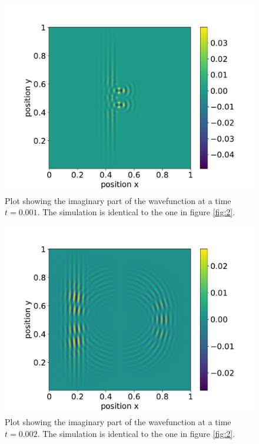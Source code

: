 \documentclass[english,notitlepage,reprint,nofootinbib]{revtex4-1}  %
\begin{document}
\begin{figure}[h!]
    \centering %
    \includegraphics[scale=0.35]{figures/contur_imag_2_12T.pdf} %
    \caption{Plot showing the imaginary part of the wavefunction at a time $t=0.001$. The simulation is identical to the one in figure \ref{fig:2}.}
\end{figure}
\FloatBarrier

\begin{figure}[h!]
    \centering %
    \includegraphics[scale=0.35]{figures/contur_imag_2_T.pdf} %
    \caption{Plot showing the imaginary part of the wavefunction at a time $t=0.002$. The simulation is identical to the one in figure \ref{fig:2}.}
    \label{fig:10}
\end{figure}
\FloatBarrier
\end{document}
